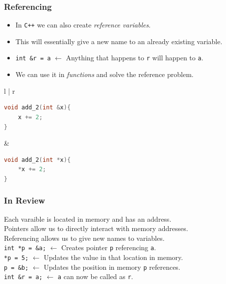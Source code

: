 \documentclass{beamer}
\begin{document}
\begin{frame}[fragile]
    \frametitle{Referencing}

    \begin{itemize}
        \item In \texttt{C++} we can also create \textit{reference variables}.
        \item This will essentially give a new name to an already existing variable.
        \item \texttt{int \&r = a} $\leftarrow$ Anything that happens to \texttt{r} will happen to \texttt{a}.
        \item We can use it in \textit{functions} and solve the reference problem.
    \end{itemize}

    \setlength{\tabcolsep}{0.5cm}
    \begin{tabular}{l | r}
    \begin{lstlisting}[language=C++,basicstyle=\small\ttfamily]
void add_2(int &x){
    x += 2;
}
    \end{lstlisting}

        &

    \begin{lstlisting}[language=C++,basicstyle=\small\ttfamily]
void add_2(int *x){
    *x += 2;
}
    \end{lstlisting}

    \end{tabular}

\end{frame}

\begin{frame}
    \frametitle{In Review}

    \tabitem Each varaible is located in memory and has an address.\\
    \tabitem Pointers allow us to directly interact with memory addresses.\\
    \tabitem Referencing allows us to give new names to variables.\\[0.5cm]

    \texttt{int *p = \&a;} $\leftarrow$ Creates pointer \texttt{p} referencing \texttt{a}.\\
    \texttt{*p = 5;} $\leftarrow$ Updates the value in that location in memory.\\
    \texttt{p = \&b;} $\leftarrow$ Updates the position in memory \texttt{p} references.\\
    \texttt{int \&r = a;} $\leftarrow$ \texttt{a} can now be called as \texttt{r}.
\end{frame}
\end{document}
